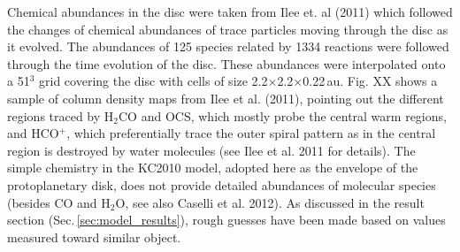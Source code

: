 \documentclass[useAMS,usenatbib]{mn2e}
\begin{document}
Chemical abundances in the disc were taken from Ilee et. al (2011) which followed the changes of chemical abundances of trace particles moving through the disc as it evolved. The abundances of 125 species related by 1334 reactions were followed through the time evolution of the disc. These abundances were interpolated onto a 51$^3$ grid covering the disc with cells of size 2.2$\times$2.2$\times$0.22$\,$au.  Fig. XX shows a sample of column density maps from Ilee et al. (2011), pointing out the different regions traced by H$_2$CO and OCS, which mostly probe the central warm regions, and HCO$^+$, which preferentially trace the outer spiral pattern as in the central region is destroyed by water molecules (see Ilee et al. 2011 for details).   The simple chemistry in the KC2010 model, adopted here as the envelope of the protoplanetary disk, does not provide detailed abundances of molecular species (besides CO and H$_2$O, see also Caselli et al. 2012). As discussed in the result section (Sec.\,\ref{sec:model_results}), rough guesses have been made based on values measured toward similar object. 


\end{document}

